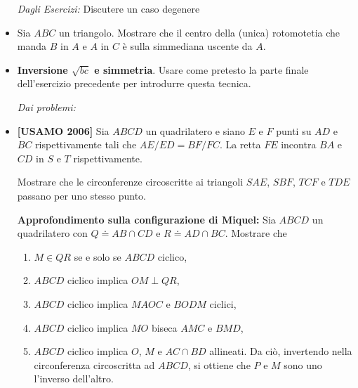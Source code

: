 \begin{itemize}
\emph{Dagli Esercizi:}
Discutere un caso degenere \item Sia $ABC$ un triangolo. Mostrare che il centro della (unica) rotomotetia che manda $B$ in $A$ e $A$ in $C$ è sulla simmediana uscente da $A$. 

\item \textbf{Inversione $\sqrt{bc}$ e simmetria}. Usare come pretesto la parte finale dell'esercizio precedente per introdurre questa tecnica. 

\emph{Dai problemi:}
\item \textbf{[USAMO 2006]} 
Sia $ABCD$ un quadrilatero e siano $E$ e $F$ punti su $AD$ e $BC$ rispettivamente tali che $AE/ED=BF/FC$.
La retta $FE$ incontra $BA$ e $CD$ in $S$ e $T$ rispettivamente. 

Mostrare che le circonferenze circoscritte ai triangoli $SAE$, $SBF$, $TCF$ e $TDE$ passano per uno stesso punto.


\textbf{Approfondimento sulla configurazione di Miquel:} Sia $ABCD$ un quadrilatero con $Q\doteq AB\cap CD$ e $R\doteq AD\cap BC$. Mostrare che 
\begin{enumerate}
	\item $M\in QR$ se e solo se $ABCD$ ciclico, 
	\item $ABCD$ ciclico implica $OM\perp QR$,
	\item $ABCD$ ciclico implica $MAOC$ e $BODM$ ciclici, 
	\item $ABCD$ ciclico implica $MO$ biseca $AMC$ e $BMD$,
	\item $ABCD$ ciclico implica $O$, $M$ e $AC\cap BD$ allineati. Da ciò, invertendo nella circonferenza circoscritta ad $ABCD$, si ottiene che $P$ e $M$ sono uno l'inverso dell'altro.
\end{enumerate}


\end{itemize}
